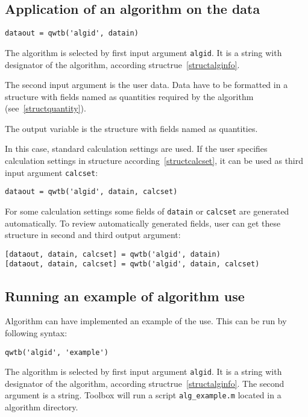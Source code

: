 \documentclass[12pt,a4paper,oneside]{report} %
\newcommand{\li}[1]{\lstinline{#1}}     %
\begin{document}
\subsection{Application of an algorithm on the data} %
\begin{lstlisting}
dataout = qwtb('algid', datain)
\end{lstlisting}

The algorithm is selected by first input argument \li{algid}. It is a string with
designator of the algorithm, according structrue~\ref{structalginfo}.

The second input argument is the user data. Data have to be formatted in a structure with fields
named as quantities required by the algorithm (see~\ref{structquantity}).

The output variable is the structure with fields named as quantities.

In this case, standard calculation settings are used. If the user specifies calculation settings
in structure according~\ref{structcalcset}, it can be used as third input argument
\li{calcset}:

\begin{lstlisting}
dataout = qwtb('algid', datain, calcset)
\end{lstlisting}

For some calculation settings some fields of \li{datain} or \li{calcset} are generated
automatically. To review automatically generated fields, user can get these structure in second and
third output argument:

\begin{lstlisting}
[dataout, datain, calcset] = qwtb('algid', datain)
[dataout, datain, calcset] = qwtb('algid', datain, calcset)
\end{lstlisting}

\subsection{Running an example of algorithm use} %
Algorithm can have implemented an example of the use. This can be run by following syntax:

\begin{lstlisting}
qwtb('algid', 'example')
\end{lstlisting}

The algorithm is selected by first input argument \li{algid}. It is a string with
designator of the algorithm, according structrue~\ref{structalginfo}. The second argument is a
string. Toolbox will run a script \li{alg_example.m} located in a algorithm directory.
\end{document}
